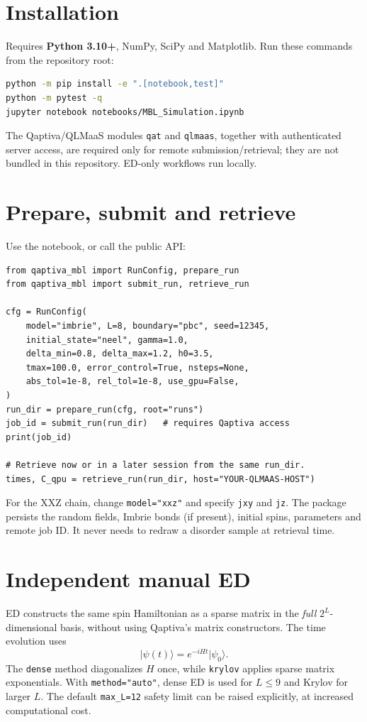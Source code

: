 \documentclass[10pt,a4paper]{article}
\newcommand{\ket}[1]{\lvert #1 \rangle}
\begin{document}
\section{Installation}
Requires \textbf{Python 3.10+}, NumPy, SciPy and Matplotlib. Run these commands from the repository root:
\begin{lstlisting}[language=bash]
python -m pip install -e ".[notebook,test]"
python -m pytest -q
jupyter notebook notebooks/MBL_Simulation.ipynb
\end{lstlisting}
The Qaptiva/QLMaaS modules \texttt{qat} and \texttt{qlmaas}, together with authenticated server access, are required only for remote submission/retrieval; they are not bundled in this repository. ED-only workflows run locally.

\clearpage
\section{Prepare, submit and retrieve}
Use the notebook, or call the public API:
\begin{lstlisting}
from qaptiva_mbl import RunConfig, prepare_run
from qaptiva_mbl import submit_run, retrieve_run

cfg = RunConfig(
    model="imbrie", L=8, boundary="pbc", seed=12345,
    initial_state="neel", gamma=1.0,
    delta_min=0.8, delta_max=1.2, h0=3.5,
    tmax=100.0, error_control=True, nsteps=None,
    abs_tol=1e-8, rel_tol=1e-8, use_gpu=False,
)
run_dir = prepare_run(cfg, root="runs")
job_id = submit_run(run_dir)   # requires Qaptiva access
print(job_id)

# Retrieve now or in a later session from the same run_dir.
times, C_qpu = retrieve_run(run_dir, host="YOUR-QLMAAS-HOST")
\end{lstlisting}

For the XXZ chain, change \texttt{model="xxz"} and specify \texttt{jxy} and \texttt{jz}. The package persists the random fields, Imbrie bonds (if present), initial spins, parameters and remote job ID. It never needs to redraw a disorder sample at retrieval time.

\section{Independent manual ED}
ED constructs the same spin Hamiltonian as a sparse matrix in the \emph{full} $2^L$-dimensional basis, without using Qaptiva's matrix constructors. The time evolution uses
\begin{equation}
\ket{\psi(t)}=e^{-iHt}\ket{\psi_0}.
\end{equation}
The \texttt{dense} method diagonalizes $H$ once, while \texttt{krylov} applies sparse matrix exponentials. With \texttt{method="auto"}, dense ED is used for $L\le9$ and Krylov for larger $L$. The default \texttt{max\_L=12} safety limit can be raised explicitly, at increased computational cost.
\end{document}
